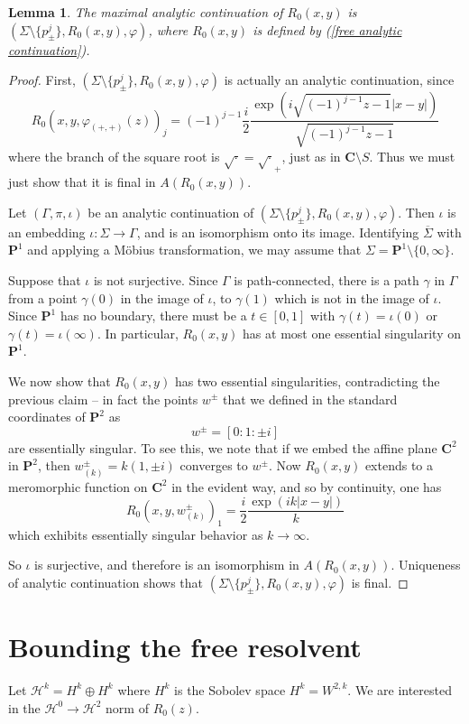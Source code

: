 \documentclass[reqno,12pt,letterpaper]{amsart}
\newcommand{\CC}{\mathbf{C}}
\newcommand{\PP}{\mathbf P}
\newtheorem{lemma}[theorem]{Lemma}
\theoremstyle{definition}
\begin{document}
\begin{lemma}
The maximal analytic continuation of $R_0(x, y)$ is $(\Sigma \setminus \{p_\pm^j\}, R_0(x, y), \varphi)$, where $R_0(x, y)$ is defined by (\ref{free analytic continuation}).
\end{lemma}
\begin{proof}
First, $(\Sigma \setminus \{p_\pm^j\}, R_0(x, y), \varphi)$ is actually an analytic continuation, since
$$R_0(x, y, \varphi_{(+, +)}(z))_j = (-1)^{j - 1} \frac{i}{2} \frac{\exp(i\sqrt{(-1)^{j-1}z - 1}|x-y|)}{\sqrt{(-1)^{j-1}z - 1}}$$
where the branch of the square root is $\sqrt\cdot = \sqrt\cdot_+$, just as in $\CC \setminus S$.
Thus we must just show that it is final in $A(R_0(x, y))$.

Let $(\Gamma, \pi, \iota)$ be an analytic continuation of $(\Sigma \setminus \{p_\pm^j\}, R_0(x, y), \varphi)$.
Then $\iota$ is an embedding $\iota: \Sigma \to \Gamma$, and is an isomorphism onto its image.
Identifying $\overline \Sigma$ with $\PP^1$ and applying a M\"obius transformation, we may assume that $\Sigma = \PP^1 \setminus \{0, \infty\}$.

Suppose that $\iota$ is not surjective.
Since $\Gamma$ is path-connected, there is a path $\gamma$ in $\Gamma$ from a point $\gamma(0)$ in the image of $\iota$, to $\gamma(1)$ which is not in the image of $\iota$.
Since $\PP^1$ has no boundary, there must be a $t \in [0, 1]$ with $\gamma(t) = \iota(0)$ or $\gamma(t) = \iota(\infty)$.
In particular, $R_0(x, y)$ has at most one essential singularity on $\PP^1$.

We now show that $R_0(x, y)$ has two essential singularities, contradicting the previous claim -- in fact the points $w^\pm$ that we defined in the standard coordinates of $\PP^2$ as
$$w^\pm = [0:1:\pm i]$$
are essentially singular. To see this, we note that if we embed the affine plane $\CC^2$ in $\PP^2$, then $w^\pm_{(k)} = k(1, \pm i)$ converges to $w^\pm$.
Now $R_0(x, y)$ extends to a meromorphic function on $\CC^2$ in the evident way, and so by continuity, one has
$$R_0(x, y, w^\pm_{(k)})_1 = \frac{i}{2} \frac{\exp(ik|x-y|)}{k}$$
which exhibits essentially singular behavior as $k \to \infty$.

So $\iota$ is surjective, and therefore is an isomorphism in $A(R_0(x, y))$.
Uniqueness of analytic continuation shows that $(\Sigma \setminus \{p_\pm^j\}, R_0(x, y), \varphi)$ is final.
\end{proof}

\section{Bounding the free resolvent}
Let $\mathcal H^k = H^k \oplus H^k$ where $H^k$ is the Sobolev space $H^k = W^{2,k}$.
We are interested in the $\mathcal H^0 \to \mathcal H^2$ norm of $R_0(z)$.
\end{document}
